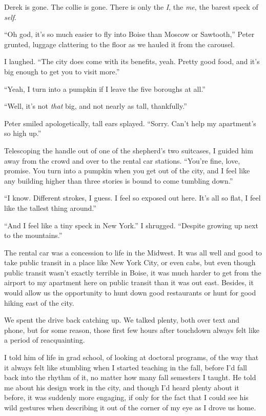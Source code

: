 Derek is gone. The collie is gone. There is only the \emph{I}, the \emph{me}, the barest speck of \emph{self}.

\secdiv{}

\noindent ``Oh god, it's so much easier to fly into Boise than Moscow or Sawtooth,'' Peter grunted, luggage clattering to the floor as we hauled it from the carousel.

I laughed. ``The city does come with its benefits, yeah. Pretty good food, and it's big enough to get you to visit more.''

``Yeah, I turn into a pumpkin if I leave the five boroughs at all.''

``Well, it's not \emph{that} big, and not nearly as tall, thankfully.''

Peter smiled apologetically, tall ears splayed. ``Sorry. Can't help my apartment's so high up.''

Telescoping the handle out of one of the shepherd's two suitcases, I guided him away from the crowd and over to the rental car stations. ``You're fine, love, promise. You turn into a pumpkin when you get out of the city, and I feel like any building higher than three stories is bound to come tumbling down.''

``I know. Different strokes, I guess. I feel so exposed out here. It's all so flat, I feel like the tallest thing around.''

``And I feel like a tiny speck in New York.'' I shrugged. ``Despite growing up next to the mountains.''

The rental car was a concession to life in the Midwest. It was all well and good to take public transit in a place like New York City, or even cabs, but even though public transit wasn't exactly terrible in Boise, it was much harder to get from the airport to my apartment here on public transit than it was out east. Besides, it would allow us the opportunity to hunt down good restaurants or hunt for good hiking east of the city.

We spent the drive back catching up. We talked plenty, both over text and phone, but for some reason, those first few hours after touchdown always felt like a period of reacquainting.

I told him of life in grad school, of looking at doctoral programs, of the way that it always felt like stumbling when I started teaching in the fall, before I'd fall back into the rhythm of it, no matter how many fall semesters I taught. He told me about his design work in the city, and though I'd heard plenty about it before, it was suddenly more engaging, if only for the fact that I could see his wild gestures when describing it out of the corner of my eye as I drove us home.

